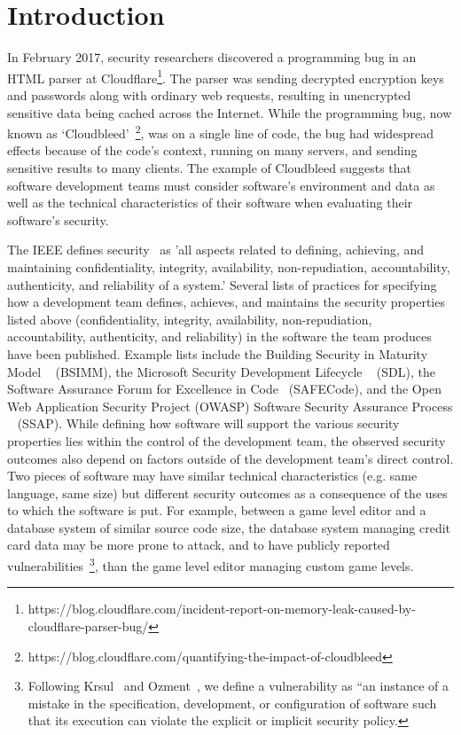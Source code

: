 \section{Introduction}
\label{sec:intro}
In February 2017, security researchers discovered a programming bug in an HTML parser at Cloudflare\footnote{https://blog.cloudflare.com/incident-report-on-memory-leak-caused-by-cloudflare-parser-bug/}. The parser was sending decrypted encryption keys and passwords along with ordinary web requests, resulting in unencrypted sensitive data being cached across the Internet. While the programming bug, now known as `Cloudbleed'~\footnote{https://blog.cloudflare.com/quantifying-the-impact-of-cloudbleed}, was on a single line of code, the bug had widespread effects because of the code's context, running on many servers, and sending sensitive results to many clients. The example of Cloudbleed suggests that software development teams must consider software's environment and data as well as the technical characteristics of their software when evaluating their software's security. 

The IEEE defines security~\cite{ieee1990glossary} as 'all aspects related to defining, achieving, and maintaining confidentiality, integrity, availability, non-repudiation, accountability, authenticity, and reliability of a system.' Several lists of practices for specifying how a development team defines, achieves, and maintains the security properties listed above (confidentiality, integrity, availability, non-repudiation, accountability, authenticity, and reliability) in the software the team produces have been published. Example lists include the Building Security in Maturity Model ~\cite{mcgraw2006software}
(BSIMM), the Microsoft Security Development Lifecycle ~\cite{howard2009security} (SDL), the Software Assurance Forum for Excellence in Code~\cite{simpson2013fundamental} (SAFECode), and the Open Web Application Security Project (OWASP) Software Security Assurance Process ~\cite{martinez2014ssap} (SSAP). While defining how software will support the various security properties lies within the control of the development team, the observed security outcomes also depend on factors outside of the development team's direct control. Two pieces of software may have similar technical characteristics (e.g. same language, same size) but different security outcomes as a consequence of the uses to which the software is put. For example, between a game level editor and a database system of similar source code size, the database system managing credit card data may be more prone to attack, and to have publicly reported vulnerabilities~\footnote{Following Krsul~\cite{krsul1998software} and Ozment~\cite{ozment2007vulnerability}, we define a vulnerability as “an instance of a mistake in the specification, development, or configuration of software such that its execution can violate the explicit or implicit security policy.}, than the game level editor managing custom game levels. 

